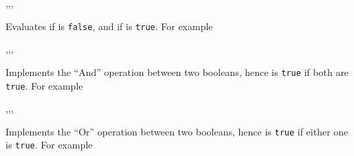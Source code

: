 \documentclass[oneside]{book}
\begin{document}
\begin{function}{\boolVarNot,\boolVarNotT,\boolVarNotF,\boolVarNotTF}
\begin{syntax}
 
  
  
   
\end{syntax}
Evaluates  if  is \verb!false!,
and  if  is \verb!true!.
For example
\begin{demohigh}
 {} {}
\end{demohigh}
\end{function}

\begin{function}{\boolVarAnd,\boolVarAndT,\boolVarAndF,\boolVarAndTF}
\begin{syntax}
  
   
   
    
\end{syntax}
Implements the \enquote{And} operation between two booleans,
hence is \texttt{true} if both are \texttt{true}.
For example
\begin{demohigh}
 {} {} {}
\end{demohigh}
\end{function}

\begin{function}{\boolVarOr,\boolVarOrT,\boolVarOrF,\boolVarOrTF}
\begin{syntax}
  
   
   
    
\end{syntax}
Implements the \enquote{Or} operation between two booleans,
hence is \texttt{true} if either one is \texttt{true}.
For example
\begin{demohigh}
 {} {} {}
\end{demohigh}
\end{function}
\end{document}
